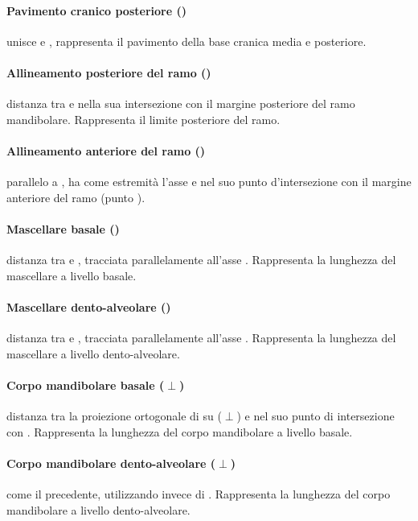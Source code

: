 \paragraph{Pavimento cranico posteriore ()} unisce  e , rappresenta il pavimento della base cranica media e posteriore.
\paragraph{Allineamento posteriore del ramo ()} distanza tra  e  nella sua intersezione con il margine posteriore del ramo mandibolare. Rappresenta il limite posteriore del ramo.
\paragraph{Allineamento anteriore del ramo ()} parallelo a , ha come estremità l'asse  e  nel suo punto d'intersezione con il margine anteriore del ramo (punto ).
\paragraph{Mascellare basale ()} distanza tra  e , tracciata parallelamente all'as\-se . Rappresenta la lunghezza del mascellare a livello basale.
\paragraph{Mascellare dento-alveolare ()} distanza tra  e , tracciata parallelamente all'asse . Rappresenta la lunghezza del mascellare a livello dento-alveolare.
\paragraph{Corpo mandibolare basale ($\perp$)} distanza tra la proiezione ortogonale di  su  ($\perp$) e  nel suo punto di intersezione con . Rappresenta la lunghezza del corpo mandibolare a livello basale.
\paragraph{Corpo mandibolare dento-alveolare ($\perp$)} come il precedente, utilizzando  invece di . Rappresenta la lunghezza del corpo mandibolare a livello dento-alveolare.
